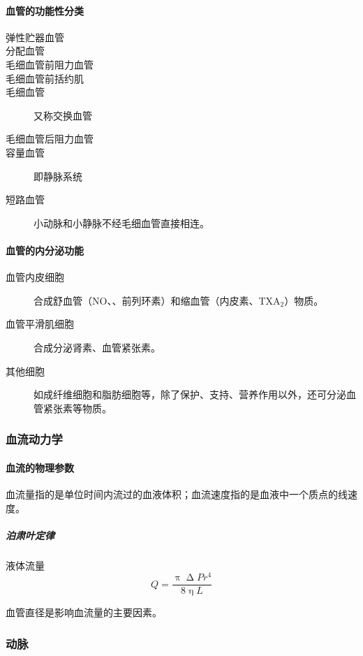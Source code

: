 \paragraph{血管的功能性分类}

\begin{description}
	\item[弹性贮器血管]
	\item[分配血管]
	\item[毛细血管前阻力血管]
	\item[毛细血管前括约肌]
	\item[毛细血管] 又称交换血管
	\item[毛细血管后阻力血管]
	\item[容量血管] 即静脉系统
	\item[短路血管] 小动脉和小静脉不经毛细血管直接相连。
\end{description}

\paragraph{血管的内分泌功能}

\begin{description}
	\item[血管内皮细胞] 合成舒血管（NO、、前列环素）和缩血管（内皮素、TXA$_{2}$）物质。
	\item[血管平滑肌细胞] 合成分泌肾素、血管紧张素。
	\item[其他细胞] 如成纤维细胞和脂肪细胞等，除了保护、支持、营养作用以外，还可分泌血管紧张素等物质。
\end{description}

\subsubsection{血流动力学}

\paragraph{血流的物理参数}

血流量指的是单位时间内流过的血液体积；血流速度指的是血液中一个质点的线速度。

\subparagraph{泊肃叶定律}

液体流量\[Q=\frac{\uppi\upDelta Pr^4}{8\upeta L}\]

血管直径是影响血流量的主要因素。

\subsubsection{动脉}

